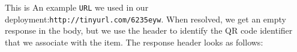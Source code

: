 

This is An example {\tt URL} we used in our deployment:{\tt http://tinyurl.com/6235eyw}.
When resolved, we get an empty response in the body, but we use the header to identify the QR code identifier 
that we associate with the item.  The response header looks as follows:


